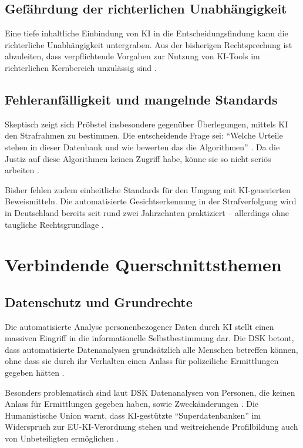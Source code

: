 \documentclass[12pt,a4paper]{article}
\begin{document}
	\subsection{Gefährdung der richterlichen Unabhängigkeit}
	
	Eine tiefe inhaltliche Einbindung von KI in die Entscheidungsfindung kann die richterliche Unabhängigkeit untergraben. Aus der bisherigen Rechtsprechung ist abzuleiten, dass verpflichtende Vorgaben zur Nutzung von KI-Tools im richterlichen Kernbereich unzulässig sind \cite{Anwaltsblatt2025}.
	
	\subsection{Fehleranfälligkeit und mangelnde Standards}
	
	Skeptisch zeigt sich Pröbstel insbesondere gegenüber Überlegungen, mittels KI den Strafrahmen zu bestimmen. Die entscheidende Frage sei: \enquote{Welche Urteile stehen in dieser Datenbank und wie bewerten das die Algorithmen} \cite{SZ2025}. Da die Justiz auf diese Algorithmen keinen Zugriff habe, könne sie so nicht seriös arbeiten \cite{SZ2025}.
	
	Bisher fehlen zudem einheitliche Standards für den Umgang mit KI-generierten Beweismitteln. Die automatisierte Gesichtserkennung in der Strafverfolgung wird in Deutschland bereits seit rund zwei Jahrzehnten praktiziert – allerdings ohne taugliche Rechtsgrundlage \cite{Nomos2025}.
	
	\section{Verbindende Querschnittsthemen}
	
	\subsection{Datenschutz und Grundrechte}
	
	Die automatisierte Analyse personenbezogener Daten durch KI stellt einen massiven Eingriff in die informationelle Selbstbestimmung dar. Die DSK betont, dass automatisierte Datenanalysen grundsätzlich alle Menschen betreffen können, ohne dass sie durch ihr Verhalten einen Anlass für polizeiliche Ermittlungen gegeben hätten \cite{DSK2025}.
	
	Besonders problematisch sind laut DSK Datenanalysen von Personen, die keinen Anlass für Ermittlungen gegeben haben, sowie Zweckänderungen \cite{Datenschutzticker2025}. Die Humanistische Union warnt, dass KI-gestützte \enquote{Superdatenbanken} im Widerspruch zur EU-KI-Verordnung stehen und weitreichende Profilbildung auch von Unbeteiligten ermöglichen \cite{HumanUnion2025}.
	
\end{document}
